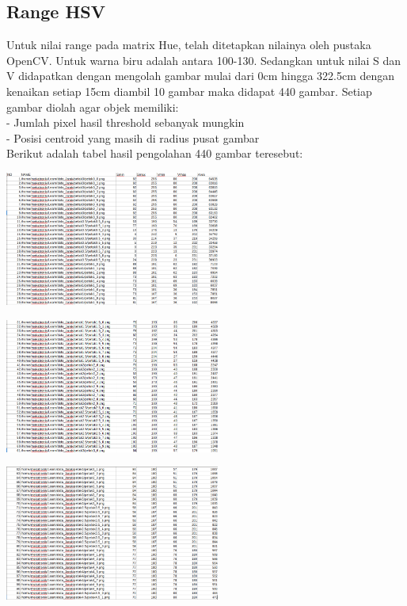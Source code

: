 \documentclass[10pt,journal,compsoc]{IEEEtran}
\begin{document}
  \subsection{Range HSV}
  Untuk nilai range pada matrix Hue, telah ditetapkan nilainya oleh pustaka OpenCV.
  Untuk warna biru adalah antara 100-130.
  Sedangkan untuk nilai S dan V didapatkan dengan mengolah gambar mulai dari 0cm hingga 322.5cm dengan kenaikan setiap 15cm diambil 10 gambar maka didapat 440 gambar.
  Setiap gambar diolah agar objek memiliki:\\
  - Jumlah pixel hasil threshold sebanyak mungkin\\
  - Posisi centroid yang masih di radius pusat gambar\\
  Berikut adalah tabel hasil pengolahan 440 gambar teresebut:\\
  \begin{center}
    \includegraphics[width=200pt]{data_jarak1}
  \end{center}
  \begin{center}
    \includegraphics[width=200pt]{data_jarak2}
  \end{center}
  \begin{center}
    \includegraphics[width=200pt]{data_jarak3}
  \end{center}
\end{document}
